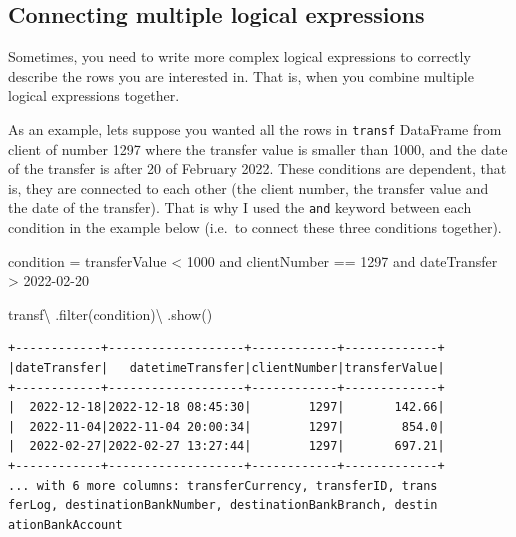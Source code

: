 \documentclass[
  11pt,
  letterpaper,
  DIV=11,
  numbers=noendperiod]{scrreprt}
\newenvironment{Shaded}{\begin{snugshade}}{\end{snugshade}}
\newcommand{\BuiltInTok}[1]{\textcolor[rgb]{0.00,0.23,0.31}{#1}}
\newcommand{\NormalTok}[1]{\textcolor[rgb]{0.00,0.23,0.31}{#1}}
\newcommand{\OperatorTok}[1]{\textcolor[rgb]{0.37,0.37,0.37}{#1}}
\newcommand{\StringTok}[1]{\textcolor[rgb]{0.13,0.47,0.30}{#1}}
\begin{document}
\subsection{Connecting multiple logical
expressions}\label{connecting-multiple-logical-expressions}

Sometimes, you need to write more complex logical expressions to
correctly describe the rows you are interested in. That is, when you
combine multiple logical expressions together.

As an example, lets suppose you wanted all the rows in \texttt{transf}
DataFrame from client of number 1297 where the transfer value is smaller
than 1000, and the date of the transfer is after 20 of February 2022.
These conditions are dependent, that is, they are connected to each
other (the client number, the transfer value and the date of the
transfer). That is why I used the \texttt{and} keyword between each
condition in the example below (i.e.~to connect these three conditions
together).

\begin{Shaded}
\begin{Highlighting}[]
\NormalTok{condition }\OperatorTok{=} \StringTok{\textquotesingle{}\textquotesingle{}\textquotesingle{}}
\StringTok{  transferValue \textless{} 1000}
\StringTok{  and clientNumber == 1297 }
\StringTok{  and dateTransfer \textgreater{} \textquotesingle{}2022{-}02{-}20\textquotesingle{}}
\StringTok{\textquotesingle{}\textquotesingle{}\textquotesingle{}}

\NormalTok{transf}\OperatorTok{\textbackslash{}}
\NormalTok{  .}\BuiltInTok{filter}\NormalTok{(condition)}\OperatorTok{\textbackslash{}}
\NormalTok{  .show()}
\end{Highlighting}
\end{Shaded}

\begin{verbatim}
+------------+-------------------+------------+-------------+
|dateTransfer|   datetimeTransfer|clientNumber|transferValue|
+------------+-------------------+------------+-------------+
|  2022-12-18|2022-12-18 08:45:30|        1297|       142.66|
|  2022-11-04|2022-11-04 20:00:34|        1297|        854.0|
|  2022-02-27|2022-02-27 13:27:44|        1297|       697.21|
+------------+-------------------+------------+-------------+
... with 6 more columns: transferCurrency, transferID, trans
ferLog, destinationBankNumber, destinationBankBranch, destin
ationBankAccount
\end{verbatim}
\end{document}
